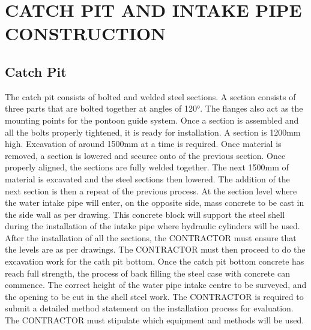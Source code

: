 \documentclass{article}%
\begin{document}
%
\section{CATCH PIT AND INTAKE PIPE CONSTRUCTION}%
\label{sec:CATCHPITANDINTAKEPIPECONSTRUCTION}%
\subsection{Catch Pit}%
\label{subsec:CatchPit}%
The catch pit consists of bolted and welded steel sections. A section consists of three parts that are bolted together at angles of 120°. The flanges also act as the mounting points for the pontoon guide system. Once a section is assembled and all the bolts properly tightened, it is ready for installation.%
\newline%
%
\newline%
%
A section is 1200mm high. Excavation of around 1500mm at a time is required. Once material is removed, a section is lowered and securec onto of the previous section. Once properly aligned, the sections are fully welded together. The next 1500mm of material is excavated and the steel sections then lowered. The addition of the next section is then a repeat of the previous process.%
\newline%
%
\newline%
%
At the section level where the water intake pipe will enter, on the opposite side, mass concrete to be cast in the side wall as per drawing. This concrete block will support the steel shell during the installation of the intake pipe where hydraulic cylinders will be used.%
\newline%
%
\newline%
%
After the installation of all the sections, the CONTRACTOR must ensure that the levels are as per drawings. The CONTRACTOR must then proceed to do the excavation work for the cath pit bottom. Once the catch pit bottom concrete has reach full strength, the process of back filling the steel case with concrete can commence.%
\newline%
%
\newline%
%
The correct height of the water pipe intake centre to be surveyed, and the opening to be cut in the shell steel work.%
\newline%
%
\newline%
%
The CONTRACTOR is required to submit a detailed method statement on the installation process for evaluation. The CONTRACTOR must stipulate which equipment and methods will be used.
\end{document}
